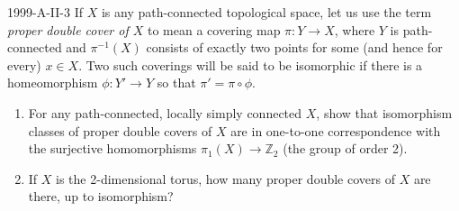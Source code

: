 \documentclass{article}
\begin{document}
	\begin{prb}{1999-A-II-3}
		If $X$ is any path-connected topological space, let us use the term \textit{proper double cover of $X$} to mean a covering map $\pi: Y \to X$, where $Y$ is path-connected and $\pi^{-1}(X)$ consists of exactly two points for some (and hence for every) $x \in X$. Two such coverings will be said to be isomorphic if there is a homeomorphism $\phi: Y' \to Y$ so that $\pi' = \pi \circ \phi$. \vspace{-0.25cm} 
		\begin{enumerate}[itemsep =-2pt,label = (\arabic{*})]
			\item For any path-connected, locally simply connected $X$, show that isomorphism classes of proper double covers of $X$ are in one-to-one correspondence with the surjective homomorphisms $\pi_{1}(X) \to \mathbb{Z}_{2}$ (the group of order 2). 
			\item If $X$ is the 2-dimensional torus, how many proper double covers of $X$ are there, up to isomorphism? 
		\end{enumerate}
	\end{prb}
\end{document}
